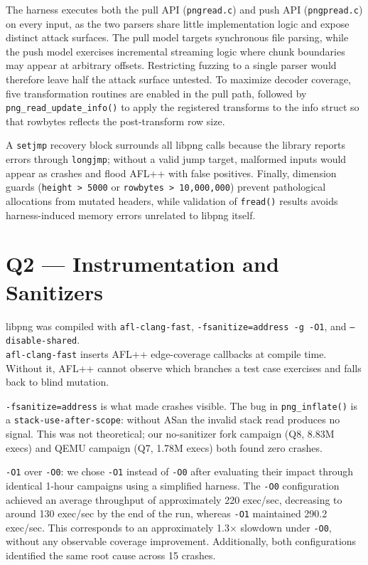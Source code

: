 \documentclass[letterpaper,twocolumn,10pt]{article}
\begin{document}
The harness executes both the pull API (\texttt{pngread.c}) and push API (\texttt{pngpread.c}) on every input, as the two parsers share little implementation logic and expose distinct attack surfaces. The pull model targets synchronous file parsing, while the push model exercises incremental streaming logic where chunk boundaries may appear at arbitrary offsets. Restricting fuzzing to a single parser would therefore leave half the attack surface untested. To maximize decoder coverage, five transformation routines are enabled in the pull path, followed by \texttt{png\_read\_update\_info()} to apply the registered transforms to the info struct so that rowbytes reflects the post-transform row size.

A \texttt{setjmp} recovery block surrounds all libpng calls because the library reports errors through \texttt{longjmp}; without a valid jump target, malformed inputs would appear as crashes and flood AFL++ with false positives. Finally, dimension guards (\texttt{height > 5000} or \texttt{rowbytes > 10,000,000}) prevent pathological allocations from mutated headers, while validation of \texttt{fread()} results avoids harness-induced memory errors unrelated to libpng itself.

\section{Q2 --- Instrumentation and Sanitizers}

\label{sec:q2}

libpng was compiled with \texttt{afl-clang-fast},
\texttt{-fsanitize=address -g -O1}, and \texttt{--disable-shared}.
\newline
\\
\texttt{afl-clang-fast} inserts AFL++ edge-coverage callbacks at
compile time. Without it, AFL++ cannot observe which branches a test
case exercises and falls back to blind mutation.

\texttt{-fsanitize=address} is what made crashes visible. The bug in
\texttt{png\_inflate()} is a \texttt{stack-use-after-scope}: without
ASan the invalid stack read produces no signal. This was not
theoretical; our no-sanitizer fork campaign (Q8, 8.83M execs) and QEMU campaign (Q7, 1.78M execs) both found zero crashes.

\texttt{-O1} over \texttt{-O0}: we chose \texttt{-O1} instead of \texttt{-O0} after evaluating their impact through identical 1-hour campaigns using a simplified harness. The \texttt{-O0} configuration achieved an average throughput of approximately 220 exec/sec, decreasing to around 130 exec/sec by the end of the run, whereas \texttt{-O1} maintained 290.2 exec/sec. This corresponds to an approximately 1.3$\times$ slowdown under \texttt{-O0}, without any observable coverage improvement. Additionally, both configurations identified the same root cause across 15 crashes.
\end{document}
